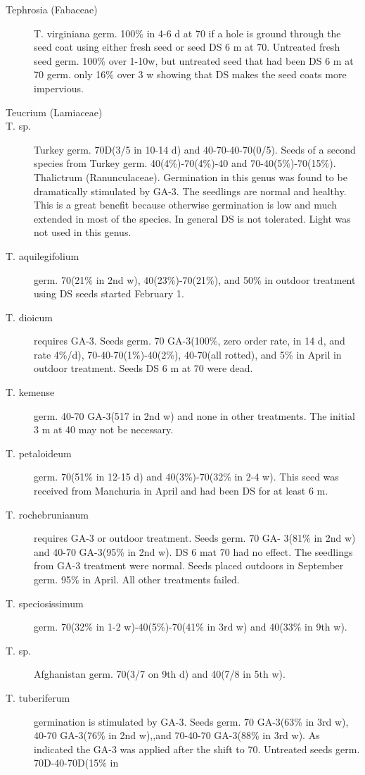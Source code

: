 \begin{description}
\item[Tephrosia (Fabaceae)] T. virginiana germ. 100\% in 4-6 d at 70 if a hole is
ground through the seed coat using either fresh seed or seed DS 6 m at 70. Untreated
fresh seed germ. 100\% over 1-10w, but untreated seed that had been DS 6 m at 70
germ. only 16\% over 3 w showing that DS makes the seed coats more impervious.
\item[Teucrium (Lamiaceae)]
\item[T. sp.] Turkey germ. 70D(3/5 in 10-14 d) and 40-70-40-70(0/5). Seeds of a
second species from Turkey germ. 40(4\%)-70(4\%)-40 and 70-40(5\%)-70(15\%).
Thalictrum (Ranunculaceae). Germination in this genus was found to be
dramatically stimulated by GA-3. The seedlings are normal and healthy. This is a
great benefit because otherwise germination is low and much extended in most of the
species. In general DS is not tolerated. Light was not used in this genus.
\item[T. aquilegifolium] germ. 70(21\% in 2nd w), 40(23\%)-70(21\%), and 50\% in
outdoor treatment using DS seeds started February 1.
\item[T. dioicum] requires GA-3. Seeds germ. 70 GA-3(100\%, zero order rate, in
14 d, and rate 4\%/d), 70-40-70(1\%)-40(2\%), 40-70(all rotted), and 5\% in April in
outdoor treatment. Seeds DS 6 m at 70 were dead.
\item[T. kemense] germ. 40-70 GA-3(517 in 2nd w) and none in other treatments. The
initial 3 m at 40 may not be necessary.
\item[T. petaloideum] germ. 70(51\% in 12-15 d) and 40(3\%)-70(32\% in 2-4 w). This
seed was received from Manchuria in April and had been DS for at least 6 m.
\item[T. rochebrunianum] requires GA-3 or outdoor treatment. Seeds germ. 70 GA-
3(81\% in 2nd w) and 40-70 GA-3(95\% in 2nd w). DS 6 mat 70 had no effect. The
seedlings from GA-3 treatment were normal. Seeds placed outdoors in September
germ. 95\% in April. All other treatments failed.
\item[T. speciosissimum] germ. 70(32\% in 1-2 w)-40(5\%)-70(41\% in 3rd w) and
40(33\% in 9th w).
\item[T. sp.] Afghanistan germ. 70(3/7 on 9th d) and 40(7/8 in 5th w).
\item[T. tuberiferum] germination is stimulated by GA-3. Seeds germ. 70 GA-3(63\% in
3rd w), 40-70 GA-3(76\% in 2nd w),,and 70-40-70 GA-3(88\% in 3rd w). As indicated
the GA-3 was applied after the shift to 70. Untreated seeds germ. 70D-40-70D(15\% in

\end{description}
